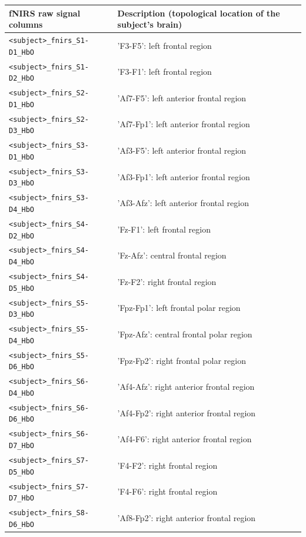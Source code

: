   \begin{table}
    \centering
    \begin{tabularx}{\textwidth}{lX}
    \toprule
    fNIRS raw signal columns & Description (topological location of the subject's brain) \\
    \midrule
    \texttt{<subject>\_fnirs\_S1-D1\_HbO} & 'F3-F5': left frontal region \\
    \texttt{<subject>\_fnirs\_S1-D2\_HbO} & 'F3-F1': left frontal region  \\
    \texttt{<subject>\_fnirs\_S2-D1\_HbO} & 'Af7-F5': left anterior frontal region  \\
    \texttt{<subject>\_fnirs\_S2-D3\_HbO} & 'Af7-Fp1': left anterior frontal region  \\
    \texttt{<subject>\_fnirs\_S3-D1\_HbO} & 'Af3-F5': left anterior frontal region  \\
    \texttt{<subject>\_fnirs\_S3-D3\_HbO} & 'Af3-Fp1': left anterior frontal region  \\
    \texttt{<subject>\_fnirs\_S3-D4\_HbO} & 'Af3-Afz': left anterior frontal region  \\
    \texttt{<subject>\_fnirs\_S4-D2\_HbO} & 'Fz-F1': left frontal region  \\
    \texttt{<subject>\_fnirs\_S4-D4\_HbO} & 'Fz-Afz': central frontal region  \\
    \texttt{<subject>\_fnirs\_S4-D5\_HbO} & 'Fz-F2': right frontal region  \\
    \texttt{<subject>\_fnirs\_S5-D3\_HbO} & 'Fpz-Fp1': left frontal polar region  \\
    \texttt{<subject>\_fnirs\_S5-D4\_HbO} & 'Fpz-Afz': central frontal polar region  \\
    \texttt{<subject>\_fnirs\_S5-D6\_HbO} & 'Fpz-Fp2': right frontal polar region  \\
    \texttt{<subject>\_fnirs\_S6-D4\_HbO} & 'Af4-Afz': right anterior frontal region  \\
    \texttt{<subject>\_fnirs\_S6-D6\_HbO} & 'Af4-Fp2': right anterior frontal region  \\
    \texttt{<subject>\_fnirs\_S6-D7\_HbO} & 'Af4-F6': right anterior frontal region  \\
    \texttt{<subject>\_fnirs\_S7-D5\_HbO} & 'F4-F2': right frontal region  \\
    \texttt{<subject>\_fnirs\_S7-D7\_HbO} & 'F4-F6': right frontal region  \\
    \texttt{<subject>\_fnirs\_S8-D6\_HbO} & 'Af8-Fp2': right anterior frontal region  \\

\end{tabularx}
\end{table}
